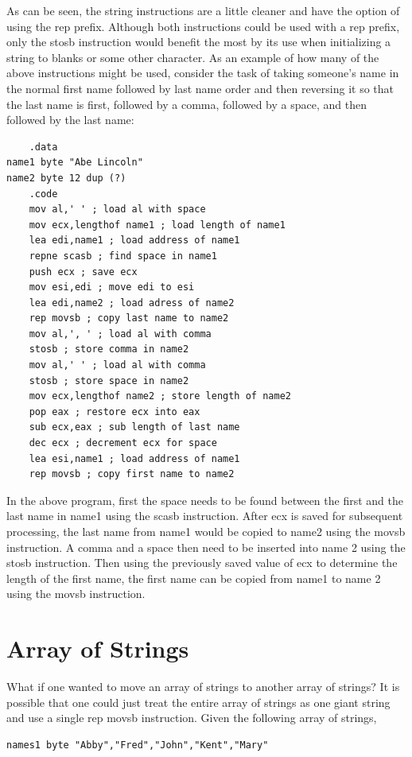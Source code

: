 \documentclass[10pt]{book}
\begin{document}
As can be seen, the string instructions are a little cleaner and have the option of using the rep prefix. Although both instructions could be used with a rep prefix, only the stosb instruction would benefit the most by its use when initializing a string to blanks or some other character. As an example of how many of the above instructions might be used, consider the task of taking someone's name in the normal first name followed by last name order and then reversing it so that the last name is first, followed by a comma, followed by a space, and then followed by the last name:

\begin{verbatim}
    .data
name1 byte "Abe Lincoln"
name2 byte 12 dup (?)
    .code
    mov al,' ' ; load al with space
    mov ecx,lengthof name1 ; load length of name1
    lea edi,name1 ; load address of name1
    repne scasb ; find space in name1
    push ecx ; save ecx
    mov esi,edi ; move edi to esi
    lea edi,name2 ; load adress of name2
    rep movsb ; copy last name to name2
    mov al,', ' ; load al with comma
    stosb ; store comma in name2
    mov al,' ' ; load al with comma
    stosb ; store space in name2
    mov ecx,lengthof name2 ; store length of name2
    pop eax ; restore ecx into eax
    sub ecx,eax ; sub length of last name
    dec ecx ; decrement ecx for space
    lea esi,name1 ; load address of name1
    rep movsb ; copy first name to name2
\end{verbatim}

In the above program, first the space needs to be found between the first and the last name in name1 using the scasb instruction. After ecx is saved for subsequent processing, the last name from name1 would be copied to name2 using the movsb instruction. A comma and a space then need to be inserted into name 2 using the stosb instruction. Then using the previously saved value of ecx to determine the length of the first name, the first name can be copied from name1 to name 2 using the movsb instruction.

\section{Array of Strings}
What if one wanted to move an array of strings to another array of strings? It is possible that one could just treat the entire array of strings as one giant string and use a single rep movsb instruction. Given the following array of strings,

\begin{verbatim}
names1 byte "Abby","Fred","John","Kent","Mary"
\end{verbatim}
\end{document}
